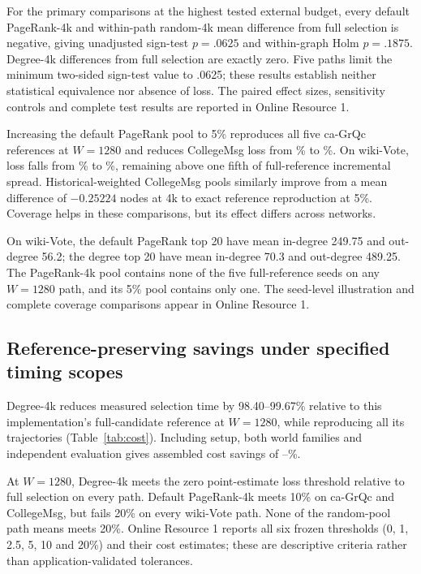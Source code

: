\documentclass[smallextended]{svjour3}
\begin{document}
For the primary comparisons at the highest tested external budget, every default PageRank-4k and within-path random-4k mean difference from full selection is negative, giving unadjusted sign-test $p=.0625$ and within-graph Holm $p=.1875$. Degree-4k differences from full selection are exactly zero. Five paths limit the minimum two-sided sign-test value to .0625; these results establish neither statistical equivalence nor absence of loss. The paired effect sizes, sensitivity controls and complete test results are reported in Online Resource 1.

Increasing the default PageRank pool to 5\% reproduces all five ca-GrQc references at $W=1280$ and reduces CollegeMsg loss from \CollegePRLoss{}\% to \CollegePRfiveLoss{}\%. On wiki-Vote, loss falls from \WikiPRLoss{}\% to \WikiPRfiveLoss{}\%, remaining above one fifth of full-reference incremental spread. Historical-weighted CollegeMsg pools similarly improve from a mean difference of $-0.25224$ nodes at 4k to exact reference reproduction at 5\%. Coverage helps in these comparisons, but its effect differs across networks.

On wiki-Vote, the default PageRank top 20 have mean in-degree 249.75 and out-degree 56.2; the degree top 20 have mean in-degree 70.3 and out-degree 489.25. The PageRank-4k pool contains none of the five full-reference seeds on any $W=1280$ path, and its 5\% pool contains only one. The seed-level illustration and complete coverage comparisons appear in Online Resource 1.

\subsection{Reference-preserving savings under specified timing scopes}
Degree-4k reduces measured selection time by 98.40--99.67\% relative to this implementation's full-candidate reference at $W=1280$, while reproducing all its trajectories (Table~\ref{tab:cost}). Including setup, both world families and independent evaluation gives assembled cost savings of \CollegeDegreeSaving{}--\WikiDegreeSaving{}\%.


At $W=1280$, Degree-4k meets the zero point-estimate loss threshold relative to full selection on every path. Default PageRank-4k meets 10\% on ca-GrQc and CollegeMsg, but fails 20\% on every wiki-Vote path. None of the random-pool path means meets 20\%. Online Resource 1 reports all six frozen thresholds (0, 1, 2.5, 5, 10 and 20\%) and their cost estimates; these are descriptive criteria rather than application-validated tolerances.
\end{document}
